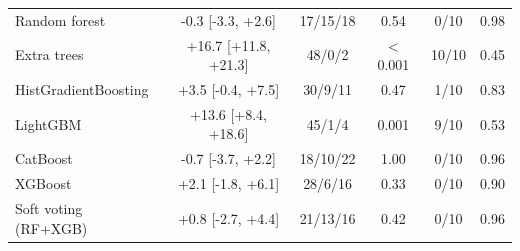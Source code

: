 \begin{tabular}{@{}lccccc@{}}
Random forest & -0.3 [-3.3, +2.6] & 17/15/18 & 0.54 & 0/10 & 0.98\\
Extra trees & +16.7 [+11.8, +21.3] & 48/0/2 & $<$0.001 & 10/10 & 0.45\\
HistGradientBoosting & +3.5 [-0.4, +7.5] & 30/9/11 & 0.47 & 1/10 & 0.83\\
LightGBM & +13.6 [+8.4, +18.6] & 45/1/4 & 0.001 & 9/10 & 0.53\\
CatBoost & -0.7 [-3.7, +2.2] & 18/10/22 & 1.00 & 0/10 & 0.96\\
XGBoost & +2.1 [-1.8, +6.1] & 28/6/16 & 0.33 & 0/10 & 0.90\\
Soft voting (RF+XGB) & +0.8 [-2.7, +4.4] & 21/13/16 & 0.42 & 0/10 & 0.96\\
\bottomrule
\end{tabular}